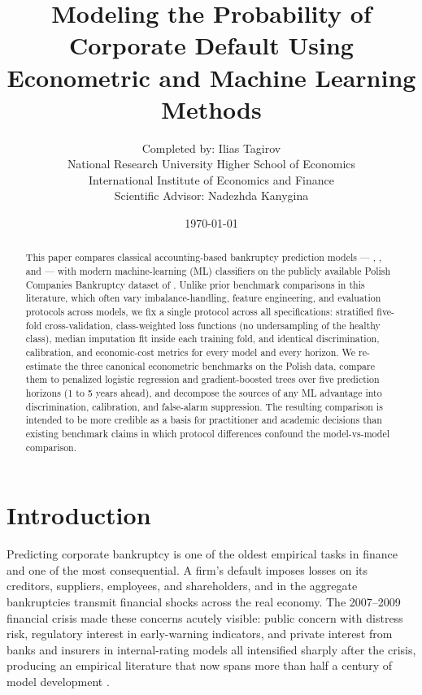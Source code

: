\documentclass[11pt,a4paper]{article}
\title{\textbf{Modeling the Probability of Corporate Default Using Econometric and Machine Learning Methods}}
\author{Completed by: Ilias Tagirov \\ \small
National Research University Higher School of Economics \\ \small
International Institute of Economics and Finance \\ \small
Scientific Advisor: Nadezhda Kanygina}
\date{\today}
\begin{document}
\maketitle

\begin{abstract}
\noindent
This paper compares classical accounting-based bankruptcy prediction models
--- \cite{altman1968}, \cite{ohlson1980}, and \cite{zmijewski1984} --- with
modern machine-learning (ML) classifiers on the publicly available Polish
Companies Bankruptcy dataset of \cite{zieba2016}. Unlike prior benchmark
comparisons in this literature, which often vary imbalance-handling, feature
engineering, and evaluation protocols across models, we fix a single protocol
across all specifications: stratified five-fold cross-validation, class-weighted
loss functions (no undersampling of the healthy class), median imputation fit
inside each training fold, and identical discrimination, calibration, and
economic-cost metrics for every model and every horizon. We re-estimate the
three canonical econometric benchmarks on the Polish data, compare them to
penalized logistic regression and gradient-boosted trees over five prediction
horizons (1 to 5 years ahead), and decompose the sources of any ML advantage
into discrimination, calibration, and false-alarm suppression. The resulting
comparison is intended to be more credible as a basis for practitioner and
academic decisions than existing benchmark claims in which protocol differences
confound the model-vs-model comparison.
\end{abstract}

\vspace{1em}

\section{Introduction}

Predicting corporate bankruptcy is one of the oldest empirical tasks in
finance and one of the most consequential. A firm's default imposes losses on
its creditors, suppliers, employees, and shareholders, and in the aggregate
bankruptcies transmit financial shocks across the real economy. The 2007--2009
financial crisis made these concerns acutely visible: public concern with
distress risk, regulatory interest in early-warning indicators, and private
interest from banks and insurers in internal-rating models all intensified
sharply after the crisis, producing an empirical literature that now spans
more than half a century of model development
\citep{altman1968, ohlson1980, zmijewski1984, shumway2001, campbell2008,
barboza2017, zieba2016, mai2019}.
\end{document}

